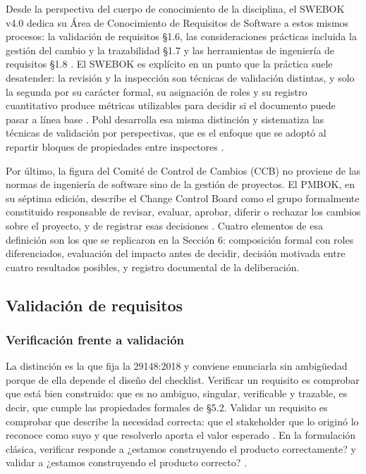 \documentclass[journal,onecolumn]{IEEEtran}
\begin{document}
	Desde la perspectiva del cuerpo de conocimiento de la disciplina, el SWEBOK v4.0 dedica su Área de Conocimiento de Requisitos de Software a estos mismos procesos: la validación de requisitos §1.6, las consideraciones prácticas incluida la gestión del cambio y la trazabilidad §1.7 y las herramientas de ingeniería de requisitos §1.8 \cite{swebok}. El SWEBOK es explícito en un punto que la práctica suele desatender: la revisión y la inspección son técnicas de validación distintas, y solo la segunda por su carácter formal, su asignación de roles y su registro cuantitativo produce métricas utilizables para decidir si el documento puede pasar a línea base \cite{swebok}. Pohl desarrolla esa misma distinción y sistematiza las técnicas de validación por perspectivas, que es el enfoque que se adoptó al repartir bloques de propiedades entre inspectores \cite{pohl}.
	
	Por último, la figura del Comité de Control de Cambios (CCB) no proviene de las normas de ingeniería de software sino de la gestión de proyectos. El PMBOK, en su séptima edición, describe el Change Control Board como el grupo formalmente constituido responsable de revisar, evaluar, aprobar, diferir o rechazar los cambios sobre el proyecto, y de registrar esas decisiones \cite{pmbok}. Cuatro elementos de esa definición son los que se replicaron en la Sección 6: composición formal con roles diferenciados, evaluación del impacto antes de decidir, decisión motivada entre cuatro resultados posibles, y registro documental de la deliberación.
	
	\subsection{Validación de requisitos}
	
	\subsubsection{Verificación frente a validación}
	
	La distinción es la que fija la 29148:2018 y conviene enunciarla sin ambigüedad porque de ella depende el diseño del checklist. Verificar un requisito es comprobar que está bien construido: que es no ambiguo, singular, verificable y trazable, es decir, que cumple las propiedades formales de §5.2. Validar un requisito es comprobar que describe la necesidad correcta: que el stakeholder que lo originó lo reconoce como suyo y que resolverlo aporta el valor esperado \cite{ieee29148}. En la formulación clásica, verificar responde a ¿estamos construyendo el producto correctamente? y validar a ¿estamos construyendo el producto correcto? \cite{swebok}.
	
\end{document}
